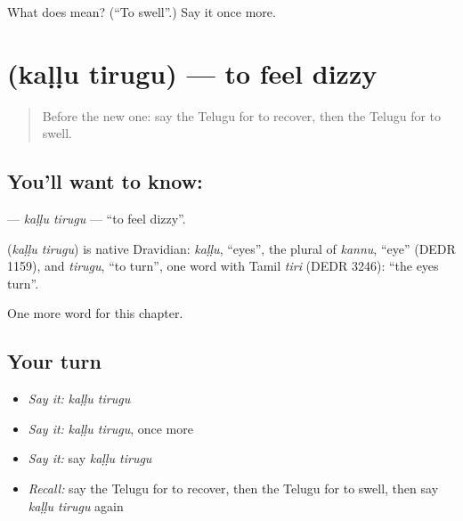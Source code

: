 \begin{tcolorbox}[breakable,colback=teal!4,colframe=teal!35!black,title={Before you move on}]
What does  mean? (\textquotedblleft{}To swell\textquotedblright{}.) Say it once more.
\end{tcolorbox}
\section[\texorpdfstring{\te{కళ్ళు} \te{తిరుగు} (kaḷḷu tirugu)}{కళ్ళు తిరుగు (kaḷḷu tirugu)}]{  (kaḷḷu tirugu) — to feel dizzy}

\label{lesson:TE-C279-kallu-tirugu}



\begin{quote}
Before the new one: say the Telugu for to recover, then the Telugu for to swell.
\end{quote}

\subsection*{You'll want to know:  }
\textbf{ } — \emph{kaḷḷu tirugu} — \textquotedblleft{}to feel dizzy\textquotedblright{}.

\begin{cousinweb}
\textbf{ } (\emph{kaḷḷu tirugu}) is native Dravidian: \emph{kaḷḷu}, \textquotedblleft{}eyes\textquotedblright{}, the plural of \emph{kannu}, \textquotedblleft{}eye\textquotedblright{} (DEDR 1159), and \emph{tirugu}, \textquotedblleft{}to turn\textquotedblright{}, one word with Tamil \emph{tiri} (DEDR 3246): \textquotedblleft{}the eyes turn\textquotedblright{}.
\end{cousinweb}

\begin{grammarlens}[title={What you've built}]
One more word for this chapter.
\end{grammarlens}

\subsection*{Your turn}
\begin{itemize}
\raggedright
  \item \emph{Say it:} \emph{kaḷḷu tirugu}
  \item \emph{Say it:} \emph{kaḷḷu tirugu}, once more
  \item \emph{Say it:} say \emph{kaḷḷu tirugu}
  \item \emph{Recall:} say the Telugu for to recover, then the Telugu for to swell, then say \emph{kaḷḷu tirugu} again
\end{itemize}

